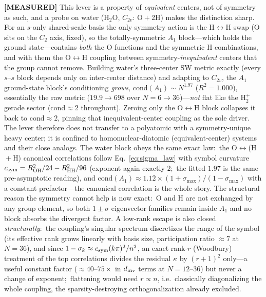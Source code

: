 \documentclass[aps,pra,twocolumn,superscriptaddress,longbibliography]{revtex4-2}
\begin{document}
\textbf{[MEASURED]} This lever is a property of \emph{equivalent} centers, not of symmetry as such, and a probe on water ($\mathrm{H}_2\mathrm{O}$, $C_{2v}$: O${}+{}$2H) makes the distinction sharp. For an $s$-only shared-scale basis the only symmetry action is the H${}\leftrightarrow{}$H swap (O sits on the $C_2$ axis, fixed), so the totally-symmetric $A_1$ block---which holds the ground state---contains \emph{both} the O functions and the symmetric H combinations, and with them the O${}\leftrightarrow{}$H coupling between symmetry-\emph{inequivalent} centers that the group cannot remove. Building water's three-center SW metric exactly (every $s$--$s$ block depends only on inter-center distance) and adapting to $C_{2v}$, the $A_1$ ground-state block's conditioning \emph{grows}, $\mathrm{cond}(A_1)\sim N^{1.97}$ ($R^2=1.000$), essentially the raw metric ($19.9\to698$ over $N=6\to36$)---\emph{not} flat like the $\mathrm{H}_2^+$ gerade sector ($\mathrm{cond}\approx2$ throughout). Zeroing only the O${}\leftrightarrow{}$H block collapses it back to $\mathrm{cond}\approx2$, pinning that inequivalent-center coupling as the sole driver. The lever therefore does not transfer to a polyatomic with a symmetry-unique heavy center; it is confined to homonuclear-diatomic (equivalent-center) systems and their close analogs.
The water block obeys the same exact law:\ the O${}\leftrightarrow{}$(H${}+{}$H) canonical correlations follow Eq.~\eqref{eq:sigma_law} with symbol curvature $c_{\rm sym}=R_{\rm OH}^2/24-R_{\rm HH}^2/96$ (exponent again exactly $2$;\ the fitted $1.97$ is the same pre-asymptotic reading), and $\mathrm{cond}(A_1)\approx1.12\times(1+\sigma_{\max})/(1-\sigma_{\max})$ with a constant prefactor---the canonical correlation is the whole story.  The structural reason the symmetry cannot help is now exact:\ O and H are not exchanged by any group element, so both $1\pm\sigma$ eigenvector families remain inside $A_1$ and no block absorbs the divergent factor.  A low-rank escape is also closed \emph{structurally}:\ the coupling's singular spectrum discretizes the range of the symbol (its effective rank grows linearly with basis size, participation ratio $\approx7$ at $N=36$), and since $1-\sigma_k\approx c_{\rm sym}(k\pi)^2/n^2$, an exact rank-$r$ (Woodbury) treatment of the top correlations divides the residual $\kappa$ by $(r+1)^2$ only---a useful constant factor ($\approx40$--$75\times$ in $d_{\rm inv}$ terms at $N=12$--$36$) but never a change of exponent;\ flattening would need $r\propto n$, i.e.\ classically diagonalizing the whole coupling, the sparsity-destroying orthogonalization already excluded.
\end{document}

